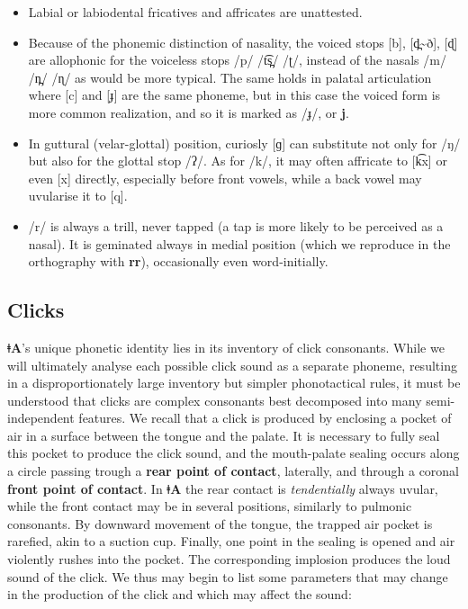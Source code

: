 \documentclass[11pt,a5paper]{book}
\newcommand{\qcn}[1]{\textcolor{AccentText}{\large\textbf{#1}}}
\newcommand{\langname}{\qcn{ǂA}}
\begin{document}
\begin{itemize}
	\item Labial or labiodental fricatives and affricates are unattested.
	\item Because of the phonemic distinction of nasality, the voiced stops [b], [d̪\textasciitilde{}ð], [ɖ] are allophonic for the voiceless stops /p/ /t͡s̪/ /ʈ/, instead of the nasals /m/ /n̪/ /ɳ/ as would be more typical. The same holds in palatal articulation where [c] and [ɟ] are the same phoneme, but in this case the voiced form is more common realization, and so it is marked as /ɟ/, or \qcn{j}.
	\item In guttural (velar-glottal) position, curiosly [ɡ] can substitute not only for /ŋ/ but also for the glottal stop /ʔ/. As for /k/, it may often affricate to [k͡x] or even [x] directly, especially before front vowels, while a back vowel may uvularise it to [q].
	\item /r/ is always a trill, never tapped (a tap is more likely to be perceived as a nasal). It is geminated always in medial position (which we reproduce in the orthography with \qcn{rr}), occasionally even word-initially.
\end{itemize}


\subsection{Clicks}

\langname's unique phonetic identity lies in its inventory of click consonants. While we will ultimately analyse each possible click sound as a separate phoneme, resulting in a disproportionately large inventory but simpler phonotactical rules, it must be understood that clicks are complex consonants best decomposed into many semi-independent features. We recall that a click is produced by enclosing a pocket of air in a surface between the tongue and the palate. It is necessary to fully seal this pocket to produce the click sound, and the mouth-palate sealing occurs along a circle passing trough a \textbf{rear point of contact}, laterally, and through a coronal \textbf{front point of contact}. In \langname{} the rear contact is \emph{tendentially} always uvular, while the front contact may be in several positions, similarly to pulmonic consonants. By downward movement of the tongue, the trapped air pocket is rarefied, akin to a suction cup. Finally, one point in the sealing is opened and air violently rushes into the pocket. The corresponding implosion produces the loud sound of the click. We thus may begin to list some parameters that may change in the production of the click and which may affect the sound:
\end{document}
